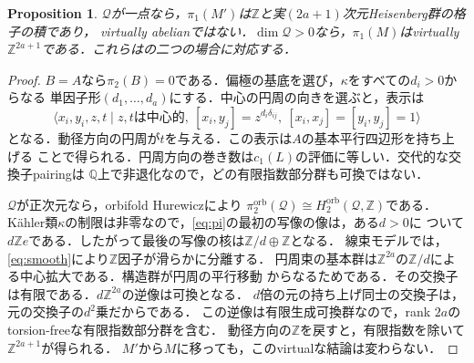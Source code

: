 \documentclass[12pt]{amsart}
\newtheorem{prop}[thm]{Proposition}
\theoremstyle{definition}
\theoremstyle{remark}
\numberwithin{equation}{section}
\newcommand{\orb}{\mathrm{orb}}
\newcommand{\Z}{\mathbb{Z}}
\newcommand{\Q}{\mathbb{Q}}
\newcommand{\Qfac}{\mathcal{Q}}
\begin{document}
\begin{prop}\label{prop:pi}
$\Qfac$が一点なら，$\pi_1(M')$は$\Z$と実$(2a+1)$次元Heisenberg群の格子の積であり，
virtually abelianではない．$\dim\Qfac>0$なら，$\pi_1(M)$はvirtually
$\Z^{2a+1}$である．これらは\cite[Corollary 5.10]{Istrati}の二つの場合に対応する．
\end{prop}
\begin{proof}
$B=A$なら$\pi_2(B)=0$である．偏極の基底を選び，$\kappa$をすべての$d_i>0$からなる
単因子形$(d_1,\ldots,d_a)$にする．中心の円周の向きを選ぶと，表示は
\begin{equation}\label{eq:heis}
\langle x_i,y_i,z,t\mid z,t\text{は中心的},\
[x_i,y_j]=z^{d_i\delta_{ij}},\ [x_i,x_j]=[y_i,y_j]=1\rangle
\end{equation}
となる．動径方向の円周が$t$を与える．この表示は$A$の基本平行四辺形を持ち上げる
ことで得られる．円周方向の巻き数は$c_1(L)$の評価に等しい．交代的な交換子pairingは
$\Q$上で非退化なので，どの有限指数部分群も可換ではない．

$\Qfac$が正次元なら，orbifold Hurewiczにより
$\pi_2^{\orb}(\Qfac)\cong H_2^{\orb}(\Qfac,\Z)$である．
K\"ahler類$\kappa$の制限は非零なので，\eqref{eq:pi}の最初の写像の像は，ある$d>0$に
ついて$d\Z e$である．したがって最後の写像の核は$\Z/d\oplus\Z$となる．
線束モデルでは，\eqref{eq:smooth}により$\Z$因子が滑らかに分離する．
円周束の基本群は$\Z^{2a}$の$\Z/d$による中心拡大である．構造群が円周の平行移動
からなるためである．その交換子は有限である．$d\Z^{2a}$の逆像は可換となる．
$d$倍の元の持ち上げ同士の交換子は，元の交換子の$d^2$乗だからである．
この逆像は有限生成可換群なので，rank $2a$のtorsion-freeな有限指数部分群を含む．
動径方向の$\Z$を戻すと，有限指数を除いて$\Z^{2a+1}$が得られる．
$M'$から$M$に移っても，このvirtualな結論は変わらない．
\end{proof}
\end{document}
